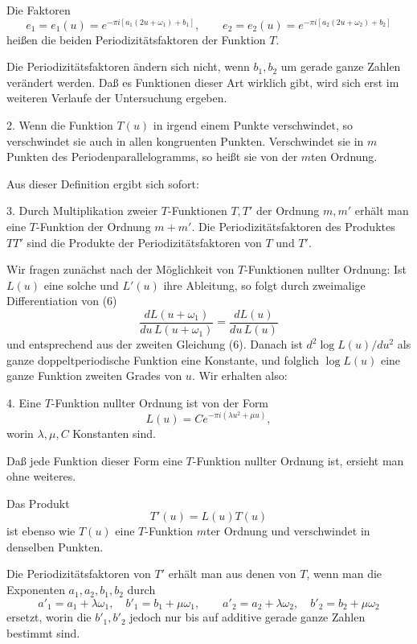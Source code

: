 \documentclass[11pt]{article}
\begin{document}
Die Faktoren
\[
e_1=e_1(u)=e^{-\pi i[a_1(2u+\omega_1)+b_1]},\qquad
e_2=e_2(u)=e^{-\pi i[a_2(2u+\omega_2)+b_2]}
\]
heißen die beiden Periodizitätsfaktoren der Funktion $T$.

Die Periodizitätsfaktoren ändern sich nicht, wenn $b_1,b_2$ um gerade ganze Zahlen verändert werden. Daß es Funktionen dieser Art wirklich gibt, wird sich erst im weiteren Verlaufe der Untersuchung ergeben.

2. Wenn die Funktion $T(u)$ in irgend einem Punkte verschwindet, so verschwindet sie auch in allen kongruenten Punkten. Verschwindet sie in $m$ Punkten des Periodenparallelogramms, so heißt sie von der $m$ten Ordnung.

Aus dieser Definition ergibt sich sofort:

3. Durch Multiplikation zweier $T$-Funktionen $T,T'$ der Ordnung $m,m'$ erhält man eine $T$-Funktion der Ordnung $m+m'$. Die Periodizitätsfaktoren des Produktes $TT'$ sind die Produkte der Periodizitätsfaktoren von $T$ und $T'$.

Wir fragen zunächst nach der Möglichkeit von $T$-Funktionen nullter Ordnung: Ist $L(u)$ eine solche und $L'(u)$ ihre Ableitung, so folgt durch zweimalige Differentiation von (6)
\[
\frac{dL(u+\omega_1)}{du\,L(u+\omega_1)}=\frac{dL(u)}{du\,L(u)}
\]
und entsprechend aus der zweiten Gleichung (6). Danach ist $d^2\log L(u)/du^2$ als ganze doppeltperiodische Funktion eine Konstante, und folglich $\log L(u)$ eine ganze Funktion zweiten Grades von $u$. Wir erhalten also:

4. Eine $T$-Funktion nullter Ordnung ist von der Form
\begin{equation}
L(u)=Ce^{-\pi i(\lambda u^2+\mu u)},
\tag{7}
\end{equation}
worin $\lambda,\mu,C$ Konstanten sind.

Daß jede Funktion dieser Form eine $T$-Funktion nullter Ordnung ist, ersieht man ohne weiteres.

Das Produkt
\begin{equation}
T'(u)=L(u)T(u)
\tag{8}
\end{equation}
ist ebenso wie $T(u)$ eine $T$-Funktion $m$ter Ordnung und verschwindet in denselben Punkten.

Die Periodizitätsfaktoren von $T'$ erhält man aus denen von $T$, wenn man die Exponenten $a_1,a_2,b_1,b_2$ durch
\begin{equation}
a'_1=a_1+\lambda\omega_1,\quad
b'_1=b_1+\mu\omega_1,\qquad
a'_2=a_2+\lambda\omega_2,\quad
b'_2=b_2+\mu\omega_2
\tag{9}
\end{equation}
ersetzt, worin die $b'_1,b'_2$ jedoch nur bis auf additive gerade ganze Zahlen bestimmt sind.
\end{document}
